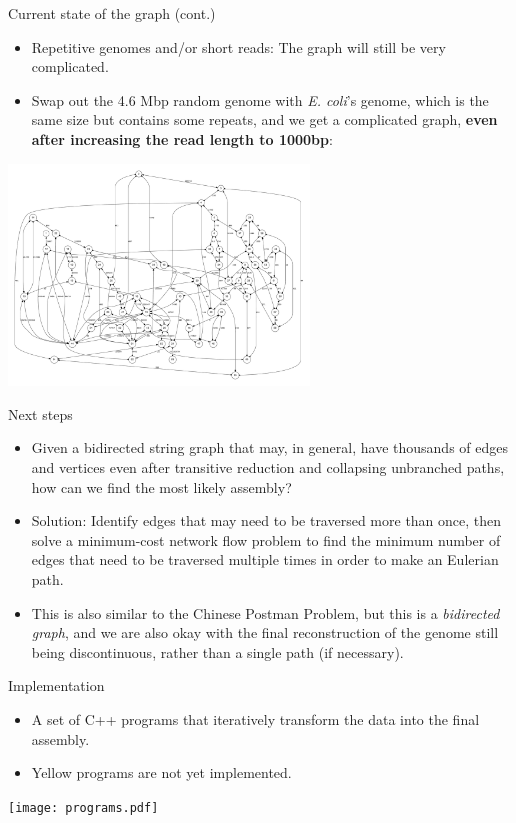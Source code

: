 \documentclass[xcolor=dvipsnames]{beamer}
\begin{document}
\begin{frame}{Current state of the graph (cont.)}
	\begin{itemize}
		\item Repetitive genomes and/or short reads: The graph will still be
		very complicated.
		\item Swap out the 4.6 Mbp random genome with {\it E. coli}'s genome,
		which is the same size but contains some repeats, and we get a
		complicated graph, {\bf even after increasing the read length to
		1000bp}:
	\end{itemize}
	\begin{center}
		\includegraphics[width=0.6\textwidth]{E_coli.pdf}
	\end{center}
\end{frame}


\begin{frame}{Next steps}
	\begin{itemize}
		\item Given a bidirected string graph that may, in general, have
		thousands of edges and vertices even after transitive reduction and
		collapsing unbranched paths, how can we find the most likely assembly?
		\item Solution: Identify edges that may need to be traversed more than
		once, then solve a minimum-cost network flow problem to find the minimum
		number of edges that need to be traversed multiple times in order to
		make an Eulerian path.
		\item This is also similar to the Chinese Postman Problem, but this is a
		{\it bidirected graph}, and we are also okay with the final
		reconstruction of the genome still being discontinuous, rather than a
		single path (if necessary).
	\end{itemize}
\end{frame}

\begin{frame}{Implementation}
	\begin{minipage}{0.3\textwidth}
		\begin{itemize}
			\item A set of C++ programs that iteratively transform the data into
			the final assembly.
			\item Yellow programs are not yet implemented.
		\end{itemize}
	\end{minipage}
	\begin{minipage}{0.67\textwidth}
		\texttt{[image: programs.pdf]}
	\end{minipage}
\end{frame}
\end{document}
